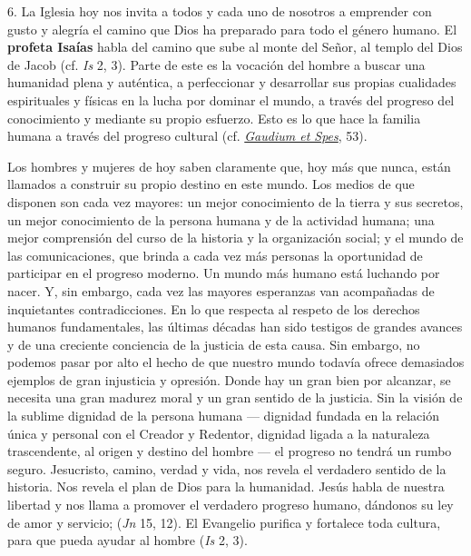 \begin{body}
	6. La Iglesia hoy nos invita a todos y cada uno de nosotros a emprender con gusto y alegría el camino que Dios ha preparado para todo el género humano. El \textbf{profeta Isaías} habla del camino que sube al monte del Señor, al templo del Dios de Jacob (cf. \emph{Is} 2, 3). Parte de este  es la vocación del hombre a buscar una humanidad plena y auténtica, a perfeccionar y desarrollar sus propias cualidades espirituales y físicas en la lucha por dominar el mundo, a través del progreso del conocimiento y mediante su propio esfuerzo. Esto es lo que hace la familia humana a través del progreso cultural (cf. \href{http://www.vatican.va/archive/hist_councils/ii_vatican_council/documents/vat-ii_const_19651207_gaudium-et-spes_it.html}{\emph{\emph{Gaudium et Spes}}}, 53).
	
	Los hombres y mujeres de hoy saben claramente que, hoy más que nunca, están llamados a construir su propio destino en este mundo. Los medios de que disponen son cada vez mayores: un mejor conocimiento de la tierra y sus secretos, un mejor conocimiento de la persona humana y de la actividad humana; una mejor comprensión del curso de la historia y la organización social; y el mundo de las comunicaciones, que brinda a cada vez más personas la oportunidad de participar en el progreso moderno. Un mundo más humano está luchando por nacer. Y, sin embargo, cada vez las mayores esperanzas van acompañadas de inquietantes contradicciones. En lo que respecta al respeto de los derechos humanos fundamentales, las últimas décadas han sido testigos de grandes avances y de una creciente conciencia de la justicia de esta causa. Sin embargo, no podemos pasar por alto el hecho de que nuestro mundo todavía ofrece demasiados ejemplos de gran injusticia y opresión. Donde hay un gran bien por alcanzar, se necesita una gran madurez moral y un gran sentido de la justicia. Sin la visión de la sublime dignidad de la persona humana --- dignidad fundada en la relación única y personal con el Creador y Redentor, dignidad ligada a la naturaleza trascendente, al origen y destino del hombre --- el progreso no tendrá un rumbo seguro. Jesucristo, camino, verdad y vida, nos revela el verdadero sentido de la historia. Nos revela el plan de Dios para la humanidad. Jesús habla de nuestra libertad y nos llama a promover el verdadero progreso humano, dándonos su ley de amor y servicio;  (\emph{Jn} 15, 12). El Evangelio purifica y fortalece toda cultura, para que pueda ayudar al hombre  (\emph{Is} 2, 3).
	

\end{body}
